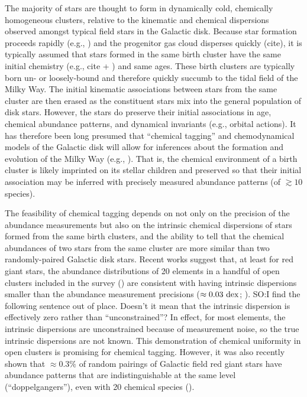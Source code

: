 \documentclass[modern, letterpaper]{aastex61}
\newcommand{\dex}{\ensuremath{{\rm dex}}}
\newcommand{\smoh}[1]{\textcolor{mediumpersianblue}{SO:#1}}
\begin{document}
The majority of stars are thought to form in dynamically cold, chemically
homogeneous clusters, relative to the kinematic and chemical
dispersions observed amongst typical field stars in the Galactic disk.
Because star formation proceeds rapidly (e.g., \citealt{Bovy:2016}) and the
progenitor gas cloud disperses quickly (cite), it is typically assumed that
stars formed in the same birth cluster have the same initial chemistry
(e.g., cite + \citealt{Feng:2014}) and same ages.
These birth clusters are typically born un- or loosely-bound and therefore
quickly succumb to the tidal field of the Milky Way.
The initial kinematic associations between stars from the same cluster are then
erased as the constituent stars mix into the general population of disk stars.
However, the stars do preserve their initial associations in age, chemical
abundance patterns, and dynamical invariants (e.g., orbital actions).
It has therefore been long presumed that ``chemical tagging'' and chemodynamical
models of the Galactic disk will allow for inferences about the formation and
evolution of the Milky Way (e.g., \citealt{todo}).
That is, the chemical environment of a birth cluster is likely imprinted on its
stellar children and preserved so that their initial association may be inferred
with precisely measured abundance patterns (of $\gtrsim 10$ species).

The feasibility of chemical tagging depends on not only on the precision of
the abundance measurements but also on the intrinsic chemical
dispersions of stars formed from the same birth clusters,
and the ability to tell that the chemical abundances of
two stars from the same cluster are more similar than two randomly-paired Galactic disk stars.
Recent works suggest that, at least for red giant stars, the abundance
distributions of 20 elements in a handful of open clusters included in the
 survey (\citealt{Majewski:2016,Nidever:2015}) are consistent
with having intrinsic dispersions smaller than the abundance measurement
precisions ($\approx 0.03~\dex$; \citealt{Bovy:2016,Ness:2017}).
\smoh{I find the following sentence out of place. Doesn't it mean that
  the intrinsic dispersion is effectively zero rather than ``unconstrained''?}
In effect, for most elements, the intrinsic dispersions are unconstrained
because of measurement noise, so the true intrinsic dispersions are not known.
This demonstration of chemical uniformity in open clusters is promising for
chemical tagging.
However, it was also recently shown that $\approx 0.3\%$ of random pairings of
Galactic field red giant stars have abundance patterns that are
indistinguishable at the same level (``doppelgangers''), even with 20 chemical
species (\citealt{Ness:2017}).
\end{document}
